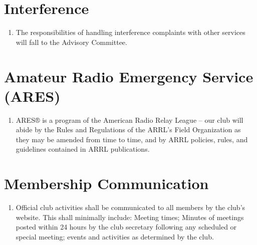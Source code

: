 \documentclass{report}
\begin{document}
\chapter{Interference}
\begin{enumerate}
\item The responsibilities of handling interference complaints with other services will fall to the Advisory Committee.
\end{enumerate}

\chapter{Amateur Radio Emergency Service (ARES)}
\begin{enumerate}
\item ARES® is a program of the American Radio Relay League -- our club will abide by the Rules and Regulations of the ARRL’s Field Organization as they may be amended from time to time, and by ARRL policies, rules, and guidelines contained in ARRL publications.
\end{enumerate}

\chapter{Membership Communication}
\begin{enumerate}
\item Official club activities shall be communicated to all members by the club's website.  This shall minimally include: Meeting times; Minutes of meetings posted within 24 hours by the club secretary following any scheduled or special meeting; events and activities as determined by the club.
\end{enumerate}
\end{document}
